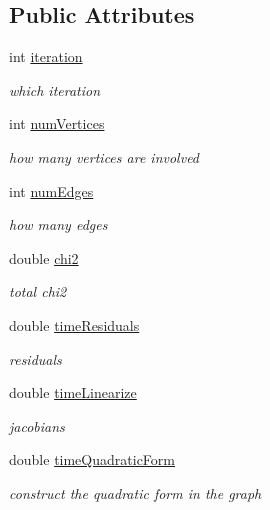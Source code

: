 \subsection*{Public Attributes}
\begin{DoxyCompactItemize}
\item 
int \mbox{\hyperlink{structg2o_1_1_g2_o_batch_statistics_a63e30077b9dad65c321b322a2a6f0aea}{iteration}}
\begin{DoxyCompactList}\small\item\em which iteration \end{DoxyCompactList}\item 
int \mbox{\hyperlink{structg2o_1_1_g2_o_batch_statistics_a2a3ecd684cb9e60c34afeee0d8f35d23}{num\+Vertices}}
\begin{DoxyCompactList}\small\item\em how many vertices are involved \end{DoxyCompactList}\item 
int \mbox{\hyperlink{structg2o_1_1_g2_o_batch_statistics_ae8924cd0e0e7fee183cba73b706eb5a5}{num\+Edges}}
\begin{DoxyCompactList}\small\item\em how many edges \end{DoxyCompactList}\item 
double \mbox{\hyperlink{structg2o_1_1_g2_o_batch_statistics_a719152d550dd4fe3300d06558fe0a6d5}{chi2}}
\begin{DoxyCompactList}\small\item\em total chi2 \end{DoxyCompactList}\item 
double \mbox{\hyperlink{structg2o_1_1_g2_o_batch_statistics_a1815f0fb0a84cd1977d72c83cefdb76b}{time\+Residuals}}
\begin{DoxyCompactList}\small\item\em residuals \end{DoxyCompactList}\item 
double \mbox{\hyperlink{structg2o_1_1_g2_o_batch_statistics_ac288190f875b8777b3c24c860a3741d7}{time\+Linearize}}
\begin{DoxyCompactList}\small\item\em jacobians \end{DoxyCompactList}\item 
double \mbox{\hyperlink{structg2o_1_1_g2_o_batch_statistics_af949afd7e25ceef08379220ed242aa36}{time\+Quadratic\+Form}}
\begin{DoxyCompactList}\small\item\em construct the quadratic form in the graph \end{DoxyCompactList}\item 

\end{DoxyCompactItemize}
